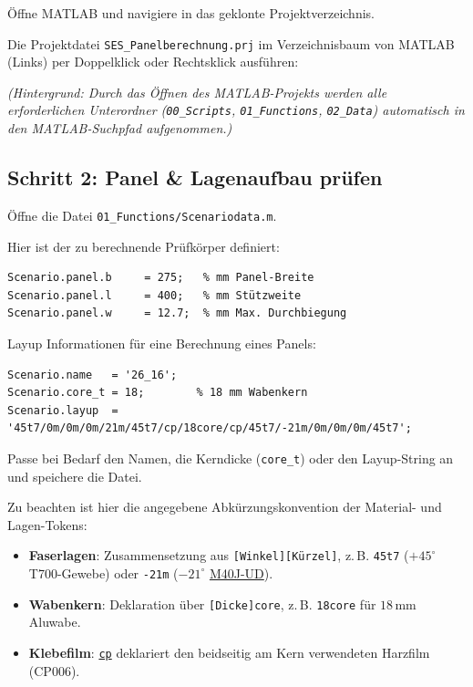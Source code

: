 Öffne MATLAB und navigiere in das geklonte Projektverzeichnis. \par
Die Projektdatei \texttt{SES\_Panelberechnung.prj} im Verzeichnisbaum  von MATLAB (Links) per Doppelklick oder Rechtsklick ausführen:

\textit{(Hintergrund: Durch das Öffnen des MATLAB-Projekts werden alle erforderlichen Unterordner (\texttt{00\_Scripts}, \texttt{01\_Functions}, \texttt{02\_Data}) automatisch in den MATLAB-Suchpfad aufgenommen.)}





\subsection*{Schritt 2: Panel \& Lagenaufbau prüfen}
Öffne die Datei \texttt{01\_Functions/Scenariodata.m}. \par
Hier ist der zu berechnende Prüfkörper definiert:
\begin{lstlisting}[style=vscodeLightMatlab]
Scenario.panel.b     = 275;   % mm Panel-Breite
Scenario.panel.l     = 400;   % mm Stützweite
Scenario.panel.w     = 12.7;  % mm Max. Durchbiegung
\end{lstlisting}

Layup Informationen für eine Berechnung eines Panels:

\begin{lstlisting}[style=vscodeLightMatlab]
Scenario.name   = '26_16';
Scenario.core_t = 18;        % 18 mm Wabenkern
Scenario.layup  = '45t7/0m/0m/0m/21m/45t7/cp/18core/cp/45t7/-21m/0m/0m/0m/45t7';
\end{lstlisting}
Passe bei Bedarf den Namen, die Kerndicke (\texttt{core\_t}) oder den Layup-String an und speichere die Datei.

Zu beachten ist hier die angegebene Abkürzungskonvention der Material- und Lagen-Tokens:
\begin{itemize}
    \item \textbf{Faserlagen}: Zusammensetzung aus \texttt{[Winkel][Kürzel]}, z.\,B. \texttt{45t7} ($+45^\circ$ T700-Gewebe) oder \texttt{-21m} ($-21^\circ$ \hyperref[abk:UD]{M40J-UD}).
    \item \textbf{Wabenkern}: Deklaration über \texttt{[Dicke]core}, z.\,B. \texttt{18core} für $18\,\text{mm}$ Aluwabe.
    \item \textbf{Klebefilm}: \hyperref[abk:CP]{\texttt{cp}} deklariert den beidseitig am Kern verwendeten Harzfilm (CP006).
\end{itemize}

